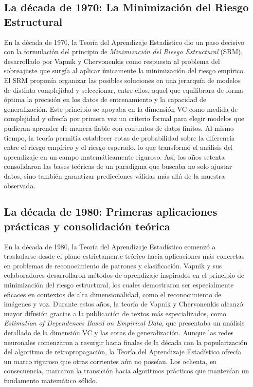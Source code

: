 \documentclass{report}
\begin{document}
\subsection{La década de 1970: La Minimización del Riesgo Estructural}

En la década de 1970, la Teoría del Aprendizaje Estadístico dio un paso decisivo con la formulación del principio de \textit{Minimización del Riesgo Estructural} (SRM), desarrollado por Vapnik y Chervonenkis como respuesta al problema del sobreajuste que surgía al aplicar únicamente la minimización del riesgo empírico. El SRM proponía organizar las posibles soluciones en una jerarquía de modelos de distinta complejidad y seleccionar, entre ellos, aquel que equilibrara de forma óptima la precisión en los datos de entrenamiento y la capacidad de generalización. Este principio se apoyaba en la dimensión VC como medida de complejidad y ofrecía por primera vez un criterio formal para elegir modelos que pudieran aprender de manera fiable con conjuntos de datos finitos. Al mismo tiempo, la teoría permitía establecer cotas de probabilidad sobre la diferencia entre el riesgo empírico y el riesgo esperado, lo que transformó el análisis del aprendizaje en un campo matemáticamente riguroso. Así, los años setenta consolidaron las bases teóricas de un paradigma que buscaba no solo ajustar datos, sino también garantizar predicciones válidas más allá de la muestra observada.

\subsection{La década de 1980: Primeras aplicaciones prácticas y consolidación teórica}

En la década de 1980, la Teoría del Aprendizaje Estadístico comenzó a trasladarse desde el plano estrictamente teórico hacia aplicaciones más concretas en problemas de reconocimiento de patrones y clasificación. Vapnik y sus colaboradores desarrollaron métodos de aprendizaje inspirados en el principio de minimización del riesgo estructural, los cuales demostraron ser especialmente eficaces en contextos de alta dimensionalidad, como el reconocimiento de imágenes y voz. Durante estos años, la teoría de Vapnik y Chervonenkis alcanzó mayor difusión gracias a la publicación de textos más especializados, como \textit{Estimation of Dependences Based on Empirical Data}, que presentaba un análisis detallado de la dimensión VC y las cotas de generalización. Aunque las redes neuronales comenzaron a resurgir hacia finales de la década con la popularización del algoritmo de retropropagación, la Teoría del Aprendizaje Estadístico ofrecía un marco riguroso que otras corrientes aún no poseían. Los ochenta, en consecuencia, marcaron la transición hacia algoritmos prácticos que mantenían un fundamento matemático sólido.
\end{document}
